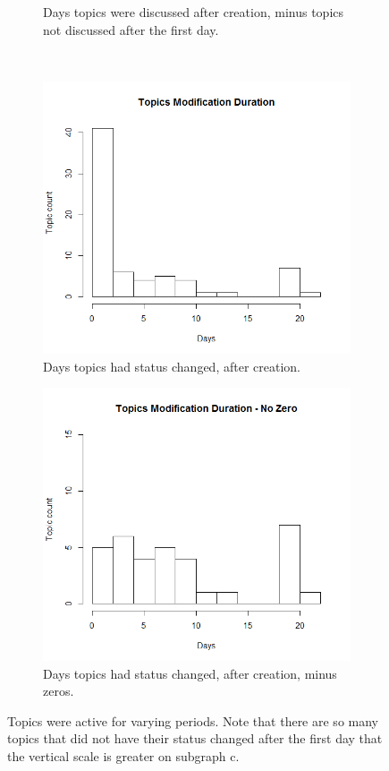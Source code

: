 \begin{figure}
\begin{subfigure}[b]{0.4\textwidth}
        \caption{Days topics were discussed after creation,
        minus topics not discussed after the first day.}
      \end{subfigure} \\
      \begin{subfigure}[b]{0.4\textwidth}
        \includegraphics[width=\textwidth]{topic_days_mod.png}
        \caption{Days topics had status changed, after creation.}
      \end{subfigure}
      \begin{subfigure}[b]{0.4\textwidth}
        \includegraphics[width=\textwidth]{topic_days_mod_nz.png}
        \caption{Days topics had status changed, after creation, minus zeros.}
      \end{subfigure}
    \caption[Duration of Topics] {
      Topics were active for varying periods.
      Note that there are so many topics that did not have their status changed
      after the first day that the vertical scale is greater on subgraph c.}
    \label{fig:topic_age}
    \end{figure}

